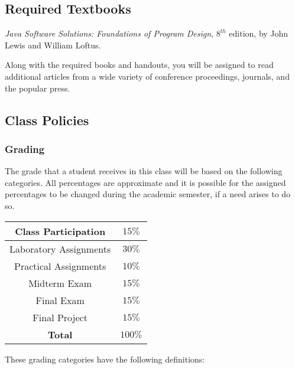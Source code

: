 \subsection*{Required Textbooks}

{\em Java Software Solutions: Foundations of Program Design}, $8^{th}$ edition, by John Lewis and William Loftus.

\noindent Along with the required books and handouts, you will be assigned to read additional articles from a wide variety of
conference proceedings, journals, and the popular press.

\subsection*{Class Policies}

\subsubsection*{Grading}
The grade that a student receives in this class will be based on the following categories. 
All percentages are approximate and it is possible for the assigned
percentages to be changed during the academic semester, if a need arises to do so.

\begin{center}
\begin{tabular}{|c|c|}
\hline
Class Participation & $15\%$\\
\hline
Laboratory Assignments  & $30\%$\\
\hline
Practical Assignments  & $10\%$\\
\hline
Midterm Exam & $15\%$\\
\hline
Final Exam & $15\%$\\
\hline
Final Project & $15\%$\\
\hline
\hline
\textbf{Total} & $100\%$\\
\hline
\end{tabular}
\end{center}

\noindent
These grading categories have the following definitions:
\vspace*{-.1in}

